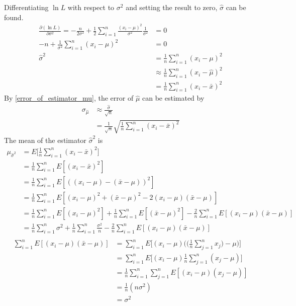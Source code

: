\documentclass[12pt,a4paper]{report}
\begin{document}
Differentiating $\ln L$ with respect to $\sigma^2$ and setting the result to zero, $\hat{\sigma}$ can be found.
\begin{align*}
\frac{\partial ( \ln L )}{\partial \sigma^2} =
-\frac{n}{2 \sigma^2} + \frac{1}{2} \sum_{i = 1}^{n} \frac{(x_i - \mu)^2}{\sigma^2} \frac{1}{\sigma^2} &= 0 \\
-n + \frac{1}{\sigma^2} \sum_{i = 1}^{n} (x_i - \mu)^2 &= 0 \\
\hat{\sigma}^2 &= \frac{1}{n} \sum_{i = 1}^{n} (x_i - \mu)^2 \\
&\approx \frac{1}{n} \sum_{i = 1}^{n} (x_i - \hat{\mu})^2 \\
&= \frac{1}{n} \sum_{i = 1}^{n} (x_i - \bar{x})^2
\end{align*}
By \ref{error_of_estimator_mu}, the error of $\hat{\mu}$ can be estimated by
\begin{align*}
\sigma_{\hat{\mu}}
&\approx \frac{\hat{\sigma}}{\sqrt{n}} \\
&= \frac{1}{\sqrt{n}} \sqrt{ \frac{1}{n} \sum_{i = 1}^{n} (x_i - \bar{x})^2 }
\end{align*}
The mean of the estimator $\hat{\sigma}^2$ is
\begin{align*}
\mu_{\hat{\sigma}^2}
&= E \Bigg[ \frac{1}{n} \sum_{i = 1}^{n} (x_i - \bar{x})^2 \Bigg] \\
&= \frac{1}{n} \sum_{i = 1}^{n} E [(x_i - \bar{x})^2] \\
&= \frac{1}{n} \sum_{i = 1}^{n} E [((x_i - \mu) - (\bar{x} - \mu))^2] \\
&= \frac{1}{n} \sum_{i = 1}^{n} E [(x_i - \mu)^2 + (\bar{x} - \mu)^2 - 2 (x_i - \mu)(\bar{x} - \mu)] \\
&= \frac{1}{n} \sum_{i = 1}^{n} E [(x_i - \mu)^2]
+ \frac{1}{n} \sum_{i = 1}^{n} E [(\bar{x} - \mu)^2]
- \frac{2}{n} \sum_{i = 1}^{n} E [(x_i - \mu)(\bar{x} - \mu)] \\
&= \frac{1}{n} \sum_{i = 1}^{n} \sigma^2
+ \frac{1}{n} \sum_{i = 1}^{n} \frac{\sigma^2}{n}
- \frac{2}{n} \sum_{i = 1}^{n} E [(x_i - \mu)(\bar{x} - \mu)] \\
\end{align*}
\begin{align*}
\sum_{i = 1}^{n} E [(x_i - \mu)(\bar{x} - \mu)]
&= \sum_{i = 1}^{n} E \Bigg[ (x_i - \mu) \Bigg( \Bigg( \frac{1}{n} \sum_{j = 1}^{n} x_j \Bigg) - \mu \Bigg) \Bigg] \\
&= \sum_{i = 1}^{n} E \Bigg[ (x_i - \mu) \frac{1}{n} \sum_{j = 1}^{n} (x_j - \mu) \Bigg] \\
&= \frac{1}{n}\sum_{i = 1}^{n} \sum_{j = 1}^{n} E[ (x_i - \mu) (x_j - \mu) ] \\
&= \frac{1}{n} (n \sigma^2) \\
&= \sigma^2
\end{align*}
\end{document}
